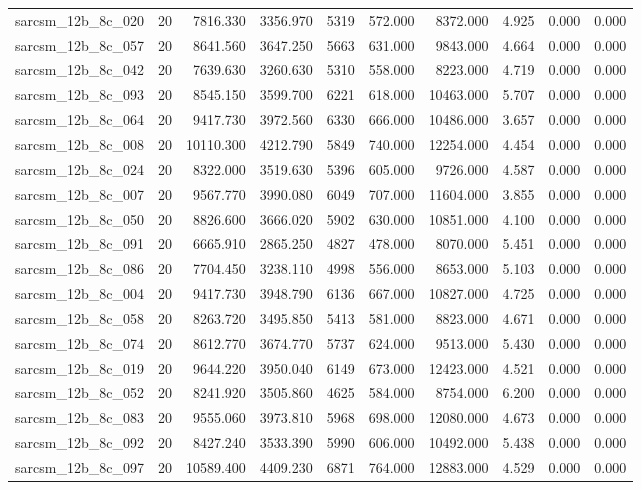 \begin{tabular}{lrrrrrrrrr}
sarcsm\_12b\_8c\_020 & 20 & 7816.330 & 3356.970 & 5319 & 572.000 & 8372.000 & 4.925 & 0.000 & 0.000 \\
sarcsm\_12b\_8c\_057 & 20 & 8641.560 & 3647.250 & 5663 & 631.000 & 9843.000 & 4.664 & 0.000 & 0.000 \\
sarcsm\_12b\_8c\_042 & 20 & 7639.630 & 3260.630 & 5310 & 558.000 & 8223.000 & 4.719 & 0.000 & 0.000 \\
sarcsm\_12b\_8c\_093 & 20 & 8545.150 & 3599.700 & 6221 & 618.000 & 10463.000 & 5.707 & 0.000 & 0.000 \\
sarcsm\_12b\_8c\_064 & 20 & 9417.730 & 3972.560 & 6330 & 666.000 & 10486.000 & 3.657 & 0.000 & 0.000 \\
sarcsm\_12b\_8c\_008 & 20 & 10110.300 & 4212.790 & 5849 & 740.000 & 12254.000 & 4.454 & 0.000 & 0.000 \\
sarcsm\_12b\_8c\_024 & 20 & 8322.000 & 3519.630 & 5396 & 605.000 & 9726.000 & 4.587 & 0.000 & 0.000 \\
sarcsm\_12b\_8c\_007 & 20 & 9567.770 & 3990.080 & 6049 & 707.000 & 11604.000 & 3.855 & 0.000 & 0.000 \\
sarcsm\_12b\_8c\_050 & 20 & 8826.600 & 3666.020 & 5902 & 630.000 & 10851.000 & 4.100 & 0.000 & 0.000 \\
sarcsm\_12b\_8c\_091 & 20 & 6665.910 & 2865.250 & 4827 & 478.000 & 8070.000 & 5.451 & 0.000 & 0.000 \\
sarcsm\_12b\_8c\_086 & 20 & 7704.450 & 3238.110 & 4998 & 556.000 & 8653.000 & 5.103 & 0.000 & 0.000 \\
sarcsm\_12b\_8c\_004 & 20 & 9417.730 & 3948.790 & 6136 & 667.000 & 10827.000 & 4.725 & 0.000 & 0.000 \\
sarcsm\_12b\_8c\_058 & 20 & 8263.720 & 3495.850 & 5413 & 581.000 & 8823.000 & 4.671 & 0.000 & 0.000 \\
sarcsm\_12b\_8c\_074 & 20 & 8612.770 & 3674.770 & 5737 & 624.000 & 9513.000 & 5.430 & 0.000 & 0.000 \\
sarcsm\_12b\_8c\_019 & 20 & 9644.220 & 3950.040 & 6149 & 673.000 & 12423.000 & 4.521 & 0.000 & 0.000 \\
sarcsm\_12b\_8c\_052 & 20 & 8241.920 & 3505.860 & 4625 & 584.000 & 8754.000 & 6.200 & 0.000 & 0.000 \\
sarcsm\_12b\_8c\_083 & 20 & 9555.060 & 3973.810 & 5968 & 698.000 & 12080.000 & 4.673 & 0.000 & 0.000 \\
sarcsm\_12b\_8c\_092 & 20 & 8427.240 & 3533.390 & 5990 & 606.000 & 10492.000 & 5.438 & 0.000 & 0.000 \\
sarcsm\_12b\_8c\_097 & 20 & 10589.400 & 4409.230 & 6871 & 764.000 & 12883.000 & 4.529 & 0.000 & 0.000 \\

\end{tabular}
